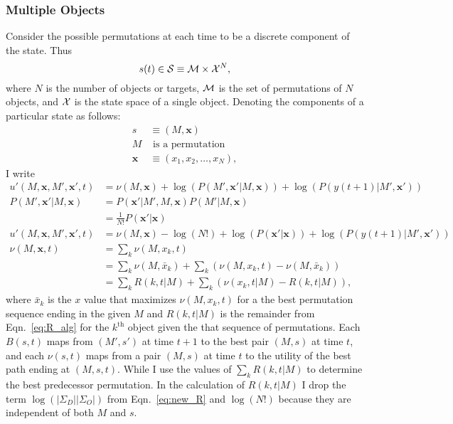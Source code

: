 \documentclass[12pt]{article}
\newcommand{\ti}[2]{{#1}{(#2)}}                         %
\newcommand{\logdet}{\log\left(\left|\Sigma_D\right| \left| \Sigma_O
    \right| \right)}
\begin{document}
\subsubsection{Multiple Objects}
\label{sec:multiple}

Consider the possible permutations at each time to be a discrete
component of the state.  Thus
\begin{equation*}
  \ti{s}{t} \in {\cal S} \equiv {\cal M} \times {\cal X}^{N},
\end{equation*}
where $N$ is the number of objects or targets, $\cal M$ is the set of
permutations of $N$ objects, and ${\cal X}$ is the state space of a
single object.  Denoting the components of a particular state as
follows: \newcommand{\bx}{{\mathbf{x}}}
\begin{align*}
  s &\equiv (M,\bx) \\
  M & \text{ is a permutation} \\
  \bx &\equiv (x_1,x_2,\ldots,x_N),
\end{align*}
I write
\begin{align*}
  u'(M,\bx,M',\bx',t) &= \nu(M,\bx) + \log \left(
    P(M',\bx'|M,\bx)\right) + \log \left(
    P(\ti{y}{t+1}|M',\bx')\right) \\
  P(M',\bx'|M,\bx) &= P(\bx'|M',M,\bx) P(M'|M,\bx) \\
  &= \frac{1}{N!} P(\bx'|\bx) \\
  u'(M,\bx,M',\bx',t) &= \nu(M,\bx) - \log(N!) + \log \left(
    P(\bx'|\bx)\right) + \log \left( P(\ti{y}{t+1}|M',\bx')\right) \\
  \nu(M,\bx,t) &= \sum_k \nu(M,x_k,t) \\
  &= \sum_k \nu(M,\bar x_k) + \sum_k \left (\nu(M,x_k,t) - \nu(M,\bar
    x_k) \right) \\
  &= \sum_k R(k,t|M) + \sum_k \left (\nu(x_k,t|M) -  R(k,t|M) \right),
\end{align*}
where $\bar x_k$ is the $x$ value that maximizes $\nu(M,x_k,t)$ for a
the best permutation sequence ending in the given $M$ and $R(k,t|M)$ is
the remainder from Eqn.~\eqref{eq:R_alg} for the $k^{\text{th}}$
object given the that sequence of permutations.  Each $B(s,t)$ maps
from $(M',s')$ at time $t+1$ to the best pair $(M,s)$ at time $t$, and
each $\nu(s,t)$ maps from a pair $(M,s)$ at time $t$ to the utility of
the best path ending at $(M,s,t)$.  While I use the values of $\sum_k
R(k,t|M)$ to determine the best predecessor permutation.  In the
calculation of $R(k,t|M)$ I drop the term $\logdet$ from
Eqn.~\eqref{eq:new_R} and $\log(N!)$ because they are independent of
both $M$ and $s$.
\end{document}
